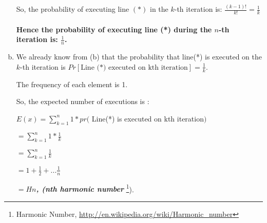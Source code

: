\begin{enumerate}[(a)]
	So, the probability of executing line $(*)$ in the $k$-th iteration is: $\frac{(k-1)!}{k!} = \frac{1}{k}$ \\
	\\
	\textbf{Hence the probability of executing line (*) during the $n$-th iteration is: $\frac{1}{n}$.} 
	
	\item
	
	We already know from (b) that the probability that line(*) is executed on the $k$-th iteration is 
	$Pr[\text{Line (*) executed on kth iteration}] = \frac{1}{k}$.
	
	The frequency of each element is 1.
	
	So, the expected number of executions is :
	
	$ E(x) = \sum\limits_{k=1}^n 1 * pr($ Line(*)$ $ is$ $ executed$ $ on$ $ kth$ $ iteration$)$
	
       $ = \sum\limits_{k=1}^n 1 * \frac{1}{k} $
       
       $ = \sum\limits_{k=1}^n \frac{1}{k} $
	
	\textbf{\emph{$ = 1 + \frac{1}{2} + ... \frac{1}{n} $}}
	
	\textbf{\emph{$ = Hn$, (nth harmonic number }}  \footnote{Harmonic Number, \url{http://en.wikipedia.org/wiki/Harmonic_number}}).

\end{enumerate}
